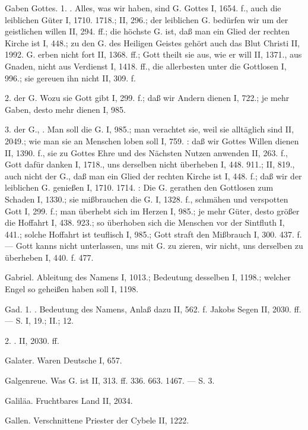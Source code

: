 Gaben Gottes. 1. . Alles, was wir haben, sind G. Gottes I, 1654. f., auch die leiblichen Güter I, 1710. 1718.; II, 296.; der leiblichen G. bedürfen wir um der geistlichen willen II, 294. ff.; die höchste G. ist, daß man ein Glied der rechten Kirche ist I, 448.; zu den G. des Heiligen Geistes gehört auch das Blut Christi II, 1992. G. erben nicht fort II, 1368. ff.; Gott theilt sie aus, wie er will II, 1371., aus Gnaden, nicht aus Verdienst I, 1418. ff., die allerbesten unter die Gottlosen I, 996.; sie gereuen ihn nicht II, 309. f.

2.  der G. Wozu sie Gott gibt I, 299. f.; daß wir Andern dienen I, 722.; je mehr Gaben, desto mehr dienen I, 985.

3.  der G., . Man soll die G.  I, 985.; man verachtet sie, weil sie alltäglich sind II, 2049.; wie man sie an Menschen loben soll I, 759. : daß wir Gottes Willen dienen II, 1390. f., sie zu Gottes Ehre und des Nächsten Nutzen anwenden II, 263. f., Gott dafür danken I, 1718., uns derselben nicht überheben I, 448. 911.; II, 819., auch nicht der G., daß man ein Glied der rechten Kirche ist I, 448. f.; daß wir der leiblichen G. genießen I, 1710. 1714. : Die G. gerathen den Gottlosen zum Schaden I, 1330.; sie mißbrauchen die G. I, 1328. f., schmähen und verspotten Gott I, 299. f.; man überhebt sich im Herzen I, 985.; je mehr Güter, desto größer die Hoffahrt I, 438. 923.; so überhoben sich die Menschen vor der Sintfluth I, 441.; solche Hoffahrt ist teuflisch I, 985.; Gott straft den Mißbrauch I, 300. 437. f. — Gott kanns nicht unterlassen, uns mit G. zu zieren, wir nicht, uns derselben zu überheben I, 440. f. 477.

Gabriel. Ableitung des Namens I, 1013.; Bedeutung desselben I, 1198.; welcher Engel so geheißen haben soll I, 1198.

Gad. 1. . Bedeutung des Namens, Anlaß dazu II, 562. f. Jakobs Segen II, 2030. ff. — S.  I, 19.; II.;  12.

2. . II, 2030. ff.

Galater. Waren Deutsche I, 657.

Galgenreue. Was G. ist II, 313. ff. 336. 663. 1467. — S.  3.

Galiläa. Fruchtbares Land II, 2034.

Gallen. Verschnittene Priester der Cybele II, 1222.

